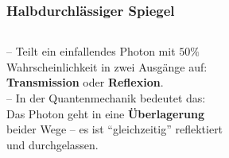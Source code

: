 \begin{frame}
\end{frame}

\begin{frame}[allowframebreaks]
	\frametitle{Halbdurchl{\"a}ssiger Spiegel}
		\begin{columns}
		\begin{column}{0.64\linewidth}
			-- Teilt ein einfallendes Photon mit $50\%$\\
				\hspace{0.5em} Wahrscheinlichkeit in zwei Ausgänge auf: \\
				\hspace{0.5em} \textbf{Transmission} oder \textbf{Reflexion}.\\
			--  In der Quantenmechanik bedeutet das:\\
				\hspace{0.5em} Das Photon geht in eine \textbf{{\"U}berlagerung} \\
				\hspace{0.5em} beider Wege – es ist \enquote{gleichzeitig} reflektiert \\
				\hspace{0.5em} und durchgelassen.\\
		\end{column}
		\begin{column}{0.34\linewidth}
		\end{column}
	\end{columns}
	\framebreak
\end{frame}

